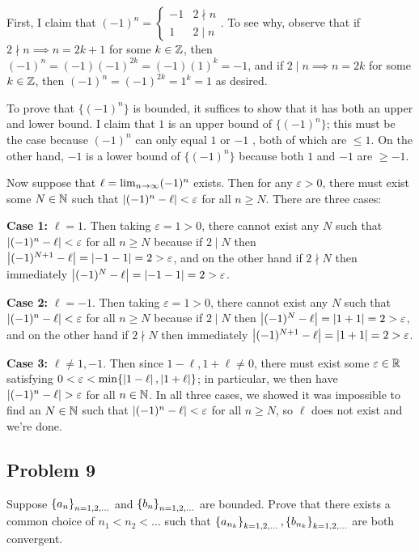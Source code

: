 \documentclass[main.tex]{subfiles}
\begin{document}
\begin{soln}
    First, I claim that $(-1)^n = \begin{cases}
        -1 & 2\nmid n \\
        1 & 2\mid n
    \end{cases}$. To see why, observe that if $2\nmid n\implies n = 2k + 1$ for some $k \in \mathbb Z$, then $(-1)^n = (-1)(-1)^{2k} = (-1)(1)^k = -1$, and if $2\mid n\implies n = 2k$ for some $k\in \mathbb Z$, then $(-1)^n = (-1)^{2k} = 1^k = 1$ as desired.
    
    To prove that $\{(-1)^n\}$ is bounded, it suffices to show that it has both an upper and lower bound. I claim that $1$ is an upper bound of $\{(-1)^n\}$; this must be the case because $(-1)^n$ can only equal $1$ or $-1$ , both of which are $\le 1$. On the other hand, $-1$ is a lower bound of $\{(-1)^n\}$ because both $1$ and $-1$ are $\ge -1$.

    Now suppose that $\ell = \lim_{n\to \infty} (-1)^n$ exists. Then for any $\varepsilon > 0$, there must exist some $N\in \mathbb N$ such that $\left\lvert (-1)^n - \ell \right\rvert < \varepsilon$ for all $n\ge N$. There are three cases:

    \textbf{Case 1:} $\ell = 1$. Then taking $\varepsilon = 1 > 0$, there cannot exist any $N$ such that $\left\lvert (-1)^n - \ell \right\rvert < \varepsilon$ for all $n \ge N$ because if $2\mid N$ then $\left\lvert (-1)^{N + 1} - \ell \right\rvert = \left\lvert -1 - 1 \right\rvert = 2 > \varepsilon$, and on the other hand if $2\nmid N$ then immediately $\left\lvert (-1)^N - \ell \right\rvert = \left\lvert -1 - 1 \right\rvert = 2 > \varepsilon$.

    \textbf{Case 2:} $\ell = -1$. Then taking $\varepsilon = 1 > 0$, there cannot exist any $N$ such that $\left\lvert (-1)^n - \ell \right\rvert < \varepsilon$ for all $n \ge N$ because if $2\mid N$ then $\left\lvert (-1)^N - \ell \right\rvert = \left\lvert 1 + 1 \right\rvert = 2 > \varepsilon$, and on the other hand if $2\nmid N$ then immediately $\left\lvert (-1)^{N + 1} - \ell \right\rvert = \left\lvert 1 + 1 \right\rvert = 2 > \varepsilon$.
    
    \textbf{Case 3:} $\ell \neq 1, -1$. Then since $1 - \ell, 1 + \ell \neq 0$, there must exist some $\varepsilon\in \mathbb R$ satisfying $0 < \varepsilon < \min\{\left\lvert 1 - \ell \right\rvert, \left\lvert 1 + \ell \right\rvert\}$; in particular, we then have $\left\lvert (-1)^n - \ell \right\rvert > \varepsilon$ for all $n \in \mathbb N$.
    In all three cases, we showed it was impossible to find an $N\in \mathbb N$ such that $\left\lvert (-1)^n - \ell \right\rvert < \varepsilon$ for all $n\ge N$, so $\ell$ does not exist and we're done.
\end{soln}
\eject

\subsection{Problem 9}
\begin{claim}
    Suppose $\left\{ a_n \right\}_{n = 1, 2, \ldots}$ and $\left\{ b_n \right\}_{n = 1, 2, \ldots}$ are bounded. Prove that there exists a common choice of $n_1 < n_2 < \ldots$ such that $\left\{ a_{n_k} \right\}_{k = 1, 2, \ldots}, \left\{ b_{n_k} \right\}_{k=1,2,\ldots}$ are both convergent.
\end{claim}
\end{document}
